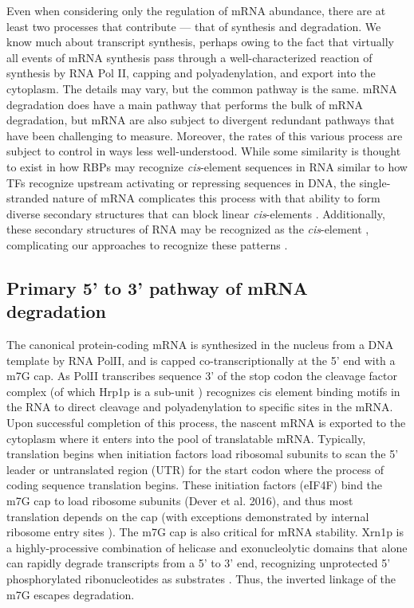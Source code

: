 Even when considering only the regulation of mRNA abundance, 
there are at least two processes that contribute --- that
of synthesis and degradation. We know much about transcript synthesis,
perhaps owing to the fact that virtually all events of mRNA synthesis
pass through a well-characterized reaction of synthesis by RNA Pol II,
capping and polyadenylation, and export into the cytoplasm. The
details may vary, but the common pathway is the same. mRNA
degradation does have a main pathway that performs the bulk of mRNA
degradation, but mRNA are also subject to divergent redundant pathways
that have been challenging to measure. Moreover, the rates of this
various process are subject to control in ways less well-understood.
While some similarity is thought to exist in how RBPs may recognize
\textit{cis}-element sequences in RNA similar to how TFs recognize 
upstream
activating or repressing sequences in DNA, the single-stranded
nature of mRNA complicates this process with that ability to form
diverse secondary structures that can block linear 
\textit{cis}-elements \parencite{li2010predicting}.
Additionally, these secondary
structures of RNA may be recognized as the \textit{cis}-element
\parencite{aviv2003rna,she2017comprehensive}, 
complicating our approaches to recognize these patterns
\parencite{goodarzi2012systematic}.

\subsection{Primary 5' to 3' pathway of mRNA degradation}

The canonical protein-coding mRNA
is synthesized in the nucleus from a DNA template by RNA PolII, and
is capped co-transcriptionally at the 5' end with a m7G cap. As PolII
transcribes sequence 3' of the stop codon the cleavage factor complex
(of which Hrp1p is a sub-unit \parencite{chen1998specific})
recognizes cis element binding motifs in the RNA to direct cleavage
and polyadenylation to specific sites in the mRNA. Upon successful
completion of this process, the nascent mRNA is exported to the
cytoplasm where it enters into the pool of translatable mRNA.
Typically, translation begins when initiation factors load ribosomal
subunits to scan the 5' leader or untranslated region (UTR) for the
start codon where the process of coding sequence translation begins.
These initiation factors (eIF4F) bind the m7G cap to load ribosome
subunits (Dever et al. 2016), and thus most translation depends on the
cap (with exceptions demonstrated by internal ribosome entry sites
\parencite{gilbert2007cap}).
The m7G cap is also critical for mRNA
stability. Xrn1p is a highly-processive combination of helicase and
exonucleolytic domains that alone can rapidly degrade
transcripts from a 5' to 3' end, recognizing unprotected 5'
phosphorylated ribonucleotides as substrates \parencite{parker2012rna}. 
Thus, the inverted linkage of the m7G escapes degradation.  


